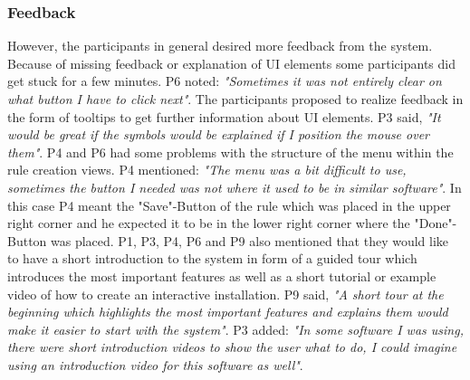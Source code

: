 \subsubsection{Feedback}
However, the participants in general desired more feedback from the system. Because of missing feedback or explanation of UI elements some participants did get stuck for a few minutes. P6 noted: \textit{"Sometimes it was not entirely clear on what button I have to click next"}. The participants proposed to realize feedback in the form of tooltips to get further information about UI elements. P3 said, \textit{"It would be great if the symbols would be explained if I position the mouse over them"}. P4 and P6 had some problems with the structure of the menu within the rule creation views. P4 mentioned: \textit{"The menu was a bit difficult to use, sometimes the button I needed was not where it used to be in similar software"}. In this case P4 meant the "Save"-Button of the rule which was placed in the upper right corner and he expected it to be in the lower right corner where the "Done"-Button was placed. P1, P3, P4, P6 and P9 also mentioned that they would like to have a short introduction to the system in form of a guided tour which introduces the most important features as well as a short tutorial or example video of how to create an interactive installation. P9 said, \textit{"A short tour at the beginning which highlights the most important features and explains them would make it easier to start with the system"}. P3 added: \textit{"In some software I was using, there were short introduction videos to show the user what to do, I could imagine using an introduction video for this software as well"}.
 
